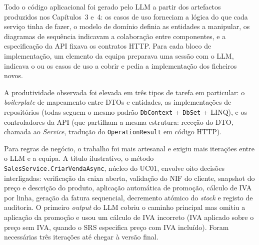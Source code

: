     Todo o código aplicacional foi gerado pelo LLM a partir dos artefactos produzidos nos Capítulos~3 e~4: os casos de uso forneciam a lógica do que cada serviço tinha de fazer, o modelo de domínio definia as entidades a manipular, os diagramas de sequência indicavam a colaboração entre componentes, e a especificação da API fixava os contratos HTTP. Para cada bloco de implementação, um elemento da equipa preparava uma sessão com o LLM, indicava o ou os casos de uso a cobrir e pedia a implementação dos ficheiros novos.

    A produtividade observada foi elevada em três tipos de tarefa em particular: o \textit{boilerplate} de mapeamento entre DTOs e entidades, as implementações de repositórios (todas seguem o mesmo padrão \texttt{DbContext} + \texttt{DbSet} + LINQ), e os controladores da API (que partilham a mesma estrutura: receção do DTO, chamada ao \textit{Service}, tradução do \texttt{OperationResult} em código HTTP).

    Para regras de negócio, o trabalho foi mais artesanal e exigiu mais iterações entre o LLM e a equipa. A título ilustrativo, o método \texttt{SalesService.CriarVendaAsync}, núcleo do UC01, envolve oito decisões interligadas: verificação da caixa aberta, validação do NIF do cliente, snapshot do preço e descrição do produto, aplicação automática de promoção, cálculo de IVA por linha, geração da fatura sequencial, decremento atómico do \textit{stock} e registo de auditoria. O primeiro \textit{output} do LLM cobriu o caminho principal mas omitiu a aplicação da promoção e usou um cálculo de IVA incorreto (IVA aplicado sobre o preço sem IVA, quando o SRS especifica preço com IVA incluído). Foram necessárias três iterações até chegar à versão final.

